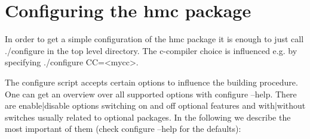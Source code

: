\section{Configuring the hmc package}

In order to get a simple configuration of the hmc package it is enough
to just call {\ttfamily ./configure} in the top level directory. The
c-compiler choice is influenced e.g. by specifying {\ttfamily
  ./configure CC=<mycc>}. 

The configure script accepts certain options to influence the building
procedure. One can get an overview over all supported options with
{\ttfamily configure --help}. There are {\ttfamily enable|disable}
options switching on and off optional features and {\ttfamily
  with|without} switches usually related to optional packages. In the
following we describe the most important of them (check {\ttfamily
  configure --help} for the defaults):

